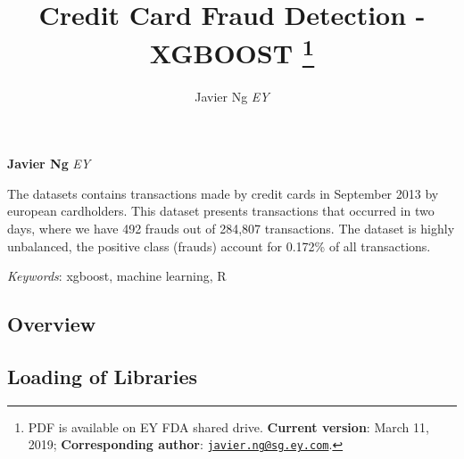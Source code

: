 \documentclass[11pt,]{article}
\title{Credit Card Fraud Detection - XGBOOST \thanks{PDF is available on EY FDA shared drive. \textbf{Current version}: March
11, 2019; \textbf{Corresponding author}:
\href{mailto:javier.ng@sg.ey.com}{\nolinkurl{javier.ng@sg.ey.com}}.}  }
\author{\Large Javier Ng\vspace{0.05in} \newline\normalsize\emph{EY}  }
\date{}
\newcommand*{\authorfont}{\fontfamily{phv}\selectfont}
\renewenvironment{abstract}
 {{%
    \setlength{\leftmargin}{0mm}
    \setlength{\rightmargin}{\leftmargin}%
  }%
  \relax}
 {\endlist}
\begin{document}
	
%

{%
\setlength{\parindent}{0pt}
\thispagestyle{plain}
{\fontsize{18}{20}\selectfont\raggedright 
\maketitle  %

}

{
   \vskip 13.5pt\relax \normalsize\fontsize{11}{12} 
\textbf{\authorfont Javier Ng} \hskip 15pt \emph{\small EY}   

}

}








\begin{abstract}

    \hbox{\vrule height .2pt width 39.14pc}

    \vskip 8.5pt %

\noindent The datasets contains transactions made by credit cards in September
2013 by european cardholders. This dataset presents transactions that
occurred in two days, where we have 492 frauds out of 284,807
transactions. The dataset is highly unbalanced, the positive class
(frauds) account for 0.172\% of all transactions.


\vskip 8.5pt \noindent \emph{Keywords}: xgboost, machine learning, R \par

    \hbox{\vrule height .2pt width 39.14pc}



\end{abstract}


\vskip 6.5pt


\noindent  \subsection{Overview}\label{overview}

\subsection{Loading of Libraries}\label{loading-of-libraries}
\end{document}
